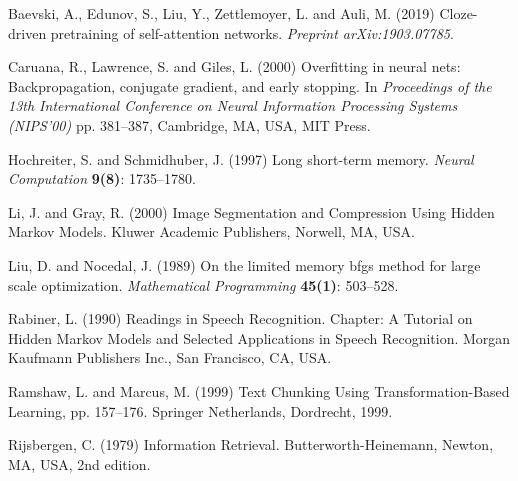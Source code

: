 \documentclass{nle}
\begin{document}
\begin{thebibliography}{}
Baevski, A., Edunov, S., Liu, Y., Zettlemoyer, L. and Auli, M. (2019)
Cloze-driven pretraining of self-attention networks.
{\it Preprint arXiv:1903.07785}.

Caruana, R., Lawrence, S. and Giles, L. (2000)
Overfitting in neural nets: Backpropagation, conjugate gradient, and early stopping.
In {\it Proceedings of the 13th International Conference on Neural Information Processing Systems (NIPS'00)}
pp. 381--387, Cambridge, MA, USA, MIT Press.

Hochreiter, S. and Schmidhuber, J. (1997)
Long short-term memory.
{\it Neural Computation}
{\bf 9(8)}: 1735--1780.

Li, J. and Gray, R. (2000)
Image Segmentation and Compression Using Hidden Markov Models.
Kluwer Academic Publishers, Norwell, MA, USA.

Liu, D. and Nocedal, J. (1989)
On the limited memory bfgs method for large scale optimization.
{\it Mathematical Programming}
{\bf 45(1)}: 503--528.

Rabiner, L. (1990)
Readings in Speech Recognition. Chapter: A Tutorial on Hidden Markov Models and Selected Applications in Speech Recognition.
Morgan Kaufmann Publishers Inc., San Francisco, CA, USA.

Ramshaw, L. and Marcus, M. (1999)
Text Chunking Using Transformation-Based Learning, 
pp. 157--176. Springer Netherlands, Dordrecht, 1999.

Rijsbergen, C. (1979)
Information Retrieval.
Butterworth-Heinemann, Newton, MA, USA, 2nd edition.

\end{thebibliography}
\end{document}
